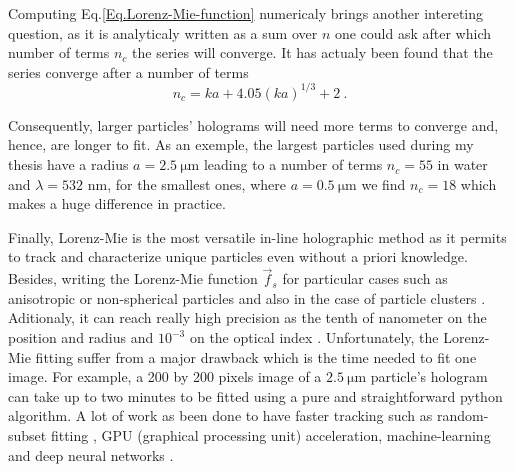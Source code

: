 Computing Eq.\ref{Eq.Lorenz-Mie-function} numericaly brings another intereting question, as it is analyticaly written as a sum over $n$ one could ask after which number of terms $n_c$ the series will converge. It has actualy been found that the series converge after a number of terms \cite{lentz_generating_1976}
\begin{equation}
	n_c = k a + 4.05 (k a)^{1/3} + 2 ~.
\end{equation}

Consequently, larger particles' holograms will need more terms to converge and, hence, are longer to fit. As an exemple, the largest particles used during my thesis have a radius $a = 2.5 ~ \mathrm{\mu m}$ leading to a number of terms $ n_c = 55$ in water and $\lambda = 532$ nm, for the smallest ones, where $a = 0.5 ~ \mathrm{\mu m}$ we find $n_c = 18$ which makes a huge difference in practice.

Finally, Lorenz-Mie is the most versatile in-line holographic method as it permits to track and characterize unique particles even without a priori knowledge. Besides, writing the Lorenz-Mie function $\vec{f}_s$ for particular cases such as anisotropic \cite{fung_holographic_2013} or non-spherical particles \cite{wang_using_2014} and also in the case of particle clusters \cite{fung_holographic_2013, perry_real-space_2013}. Aditionaly, it can reach really high precision as the tenth of nanometer on the position and radius and $10^{-3}$ on the optical index \cite{lee_characterizing_2007}. Unfortunately, the Lorenz-Mie fitting suffer from a major drawback which is the time needed to fit one image. For example, a 200 by 200 pixels image of a $2.5 ~ \mathrm{\mu m}$ particle's hologram can take up to two minutes to be fitted using a pure and straightforward python algorithm. A lot of work as been done to have faster tracking such as random-subset fitting \cite{dimiduk_random-subset_2014}, GPU (graphical processing unit) acceleration, machine-learning \cite{yevick_machine-learning_2014, hannel_machine-learning_2018} and deep neural networks \cite{altman_catch_2020}.

